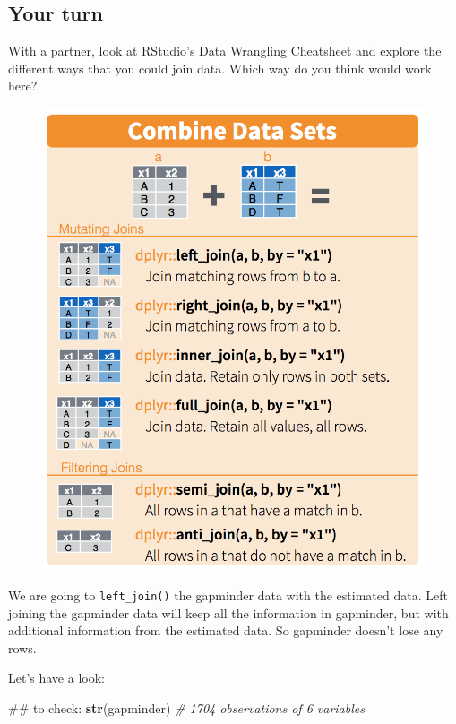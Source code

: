 \documentclass[]{book}
\newenvironment{Shaded}{\begin{snugshade}}{\end{snugshade}}
\newcommand{\KeywordTok}[1]{\textcolor[rgb]{0.13,0.29,0.53}{\textbf{#1}}}
\newcommand{\CommentTok}[1]{\textcolor[rgb]{0.56,0.35,0.01}{\textit{#1}}}
\newcommand{\NormalTok}[1]{#1}
\theoremstyle{definition}
\theoremstyle{definition}
\theoremstyle{definition}
\theoremstyle{remark}
\begin{document}
\subsection{Your turn}\label{your-turn-13}

With a partner, look at RStudio's Data Wrangling Cheatsheet and explore
the different ways that you could join data. Which way do you think
would work here?

\begin{figure}
\centering
\includegraphics{img/rstudio-cheatsheet-combine-options.png}
\caption{}
\end{figure}

We are going to \texttt{left\_join()} the gapminder data with the
estimated data. Left joining the gapminder data will keep all the
information in gapminder, but with additional information from the
estimated data. So gapminder doesn't lose any rows.

Let's have a look:

\begin{Shaded}
\begin{Highlighting}[]
\NormalTok{## to check:}
\KeywordTok{str}\NormalTok{(gapminder) }\CommentTok{# 1704 observations of 6 variables}
\end{Highlighting}
\end{Shaded}
\end{document}
